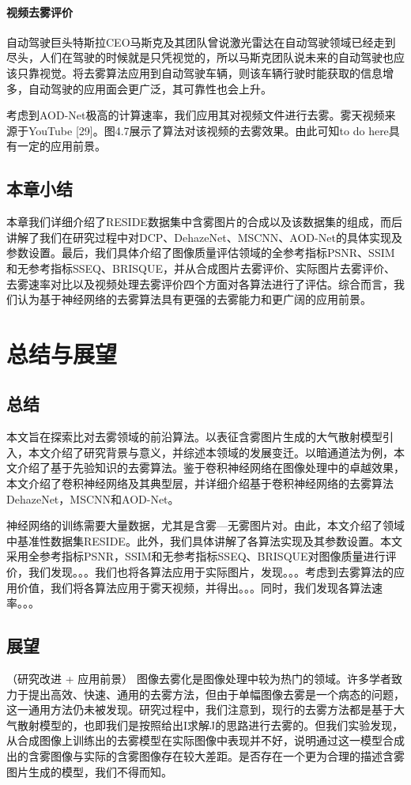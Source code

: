 \documentclass[a4paper, 12pt]{report}
\begin{document}
\subsubsection{视频去雾评价\quad}
自动驾驶巨头特斯拉CEO马斯克及其团队曾说激光雷达在自动驾驶领域已经走到尽头，人们在驾驶的时候就是只凭视觉的，所以马斯克团队说未来的自动驾驶也应该只靠视觉。将去雾算法应用到自动驾驶车辆，则该车辆行驶时能获取的信息增多，自动驾驶的应用面会更广泛，其可靠性也会上升。

考虑到AOD-Net极高的计算速率，我们应用其对视频文件进行去雾。雾天视频来源于YouTube [29]。图4.7展示了算法对该视频的去雾效果。由此可知to do here具有一定的应用前景。

\section{本章小结\quad}
本章我们详细介绍了RESIDE数据集中含雾图片的合成以及该数据集的组成，而后讲解了我们在研究过程中对DCP、DehazeNet、MSCNN、AOD-Net的具体实现及参数设置。最后，我们具体介绍了图像质量评估领域的全参考指标PSNR、SSIM和无参考指标SSEQ、BRISQUE，并从合成图片去雾评价、实际图片去雾评价、去雾速率对比以及视频处理去雾评价四个方面对各算法进行了评估。综合而言，我们认为基于神经网络的去雾算法具有更强的去雾能力和更广阔的应用前景。

\chapter{总结与展望\quad}
\section{总结\quad}
本文旨在探索比对去雾领域的前沿算法。以表征含雾图片生成的大气散射模型引入，本文介绍了研究背景与意义，并综述本领域的发展变迁。以暗通道法为例，本文介绍了基于先验知识的去雾算法。鉴于卷积神经网络在图像处理中的卓越效果，本文介绍了卷积神经网络及其典型层，并详细介绍基于卷积神经网络的去雾算法DehazeNet，MSCNN和AOD-Net。

神经网络的训练需要大量数据，尤其是含雾—无雾图片对。由此，本文介绍了领域中基准性数据集RESIDE。此外，我们具体讲解了各算法实现及其参数设置。本文采用全参考指标PSNR，SSIM和无参考指标SSEQ、BRISQUE对图像质量进行评价，我们发现。。。我们也将各算法应用于实际图片，发现。。。考虑到去雾算法的应用价值，我们将各算法应用于雾天视频，并得出。。。同时，我们发现各算法速率。。。
	
\section{展望\quad}
（研究改进 + 应用前景）
图像去雾化是图像处理中较为热门的领域。许多学者致力于提出高效、快速、通用的去雾方法，但由于单幅图像去雾是一个病态的问题，这一通用方法仍未被发现。研究过程中，我们注意到，现行的去雾方法都是基于大气散射模型的，也即我们是按照给出I求解J的思路进行去雾的。但我们实验发现，从合成图像上训练出的去雾模型在实际图像中表现并不好，说明通过这一模型合成出的含雾图像与实际的含雾图像存在较大差距。是否存在一个更为合理的描述含雾图片生成的模型，我们不得而知。
\end{document}
